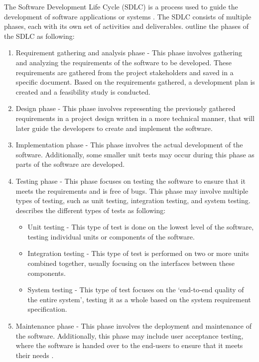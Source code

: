 The Software Development Life Cycle (SDLC) is a process used to guide the development of software applications or systems \parencite{sdlc1}. The SDLC consists of multiple phases, each with its own set of activities and deliverables. \textcite{sdlc2} outline the phases of the SDLC as following:
\begin{enumerate}
    \item Requirement gathering and analysis phase - This phase involves gathering and analyzing the requirements of the software to be developed. These requirements are gathered from the project stakeholders and saved in a specific document. Based on the requirements gathered, a development plan is created and a feasibility study is conducted.
    \item Design phase - This phase involves representing the previously gathered requirements in a project design written in a more technical manner, that will later guide the developers to create and implement the software. 
    \item Implementation phase - This phase involves the actual development of the software. Additionally, some smaller unit tests may occur during this phase as parts of the software are developed.
    \item Testing phase - This phase focuses on testing the software to ensure that it meets the requirements and is free of bugs. This phase may involve multiple types of testing, such as unit testing, integration testing,  and system testing. \textcite{testing} describes the different types of tests as following:
    \begin{itemize}
    \item Unit testing - This type of test is done on the lowest level of the software, testing individual units or components of the software.
    \item Integration testing - This type of test is performed on two or more units combined together, usually focusing on the interfaces between these components.
    \item System testing - This type of test focuses on the `end-to-end quality of the entire system', testing it as a whole based on the system requirement specification.
    \end{itemize}
    \item Maintenance phase - This phase involves the deployment and maintenance of the software. Additionally, this phase may include user acceptance testing, where the software is handed over to the end-users to ensure that it meets their needs \parencite{testing}. 
\end{enumerate}


